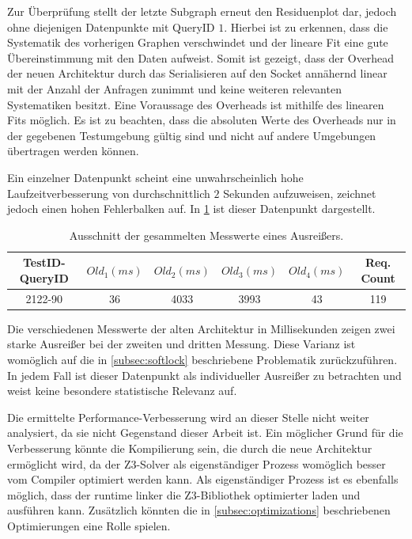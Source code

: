 Zur Überprüfung stellt der letzte Subgraph erneut den Residuenplot dar, jedoch ohne diejenigen Datenpunkte mit QueryID $1$.
Hierbei ist zu erkennen, dass die Systematik des vorherigen Graphen verschwindet und der lineare Fit eine gute Übereinstimmung mit den Daten aufweist.
Somit ist gezeigt, dass der Overhead der neuen Architektur durch das Serialisieren auf den Socket annähernd linear mit der Anzahl der Anfragen zunimmt
und keine weiteren relevanten Systematiken besitzt. Eine Voraussage des Overheads ist mithilfe des linearen Fits möglich.
Es ist zu beachten, dass die absoluten Werte des Overheads nur in der gegebenen Testumgebung gültig sind und nicht auf andere Umgebungen übertragen werden können.

Ein einzelner Datenpunkt scheint eine unwahrscheinlich hohe Laufzeitverbesserung von durchschnittlich $2$ Sekunden aufzuweisen, zeichnet jedoch einen hohen Fehlerbalken auf.
In \cref{tab:broken-datapoint} ist dieser Datenpunkt dargestellt.

\begin{table}[!htp]
    \centering
    \caption{Ausschnitt der gesammelten Messwerte eines Ausreißers.}
    \label{tab:broken-datapoint}
    \begin{tabular}{ cccccc }
        \toprule
        \textbf{TestID-QueryID} & \textbf{$Old_1(ms)$} & \textbf{$Old_2(ms)$} & \textbf{$Old_3(ms)$} & \textbf{$Old_4(ms)$} & \textbf{Req. Count} \\
        \midrule
        2122-90                 & 36                   & 4033                 & 3993                 & 43                   & 119                 \\
        \bottomrule
    \end{tabular}
\end{table}

Die verschiedenen Messwerte der alten Architektur in Millisekunden zeigen zwei starke Ausreißer bei der zweiten und dritten Messung.
Diese Varianz ist womöglich auf die in \cref{subsec:softlock} beschriebene Problematik zurückzuführen.
In jedem Fall ist dieser Datenpunkt als individueller Ausreißer zu betrachten und weist keine besondere statistische Relevanz auf.

Die ermittelte Performance-Verbesserung wird an dieser Stelle nicht weiter analysiert, da sie nicht Gegenstand dieser Arbeit ist.
Ein möglicher Grund für die Verbesserung könnte die Kompilierung sein, die durch die neue Architektur ermöglicht wird,
da der Z3-Solver als eigenständiger Prozess womöglich besser vom Compiler optimiert werden kann.
Als eigenständiger Prozess ist es ebenfalls möglich, dass der runtime linker die Z3-Bibliothek optimierter laden und ausführen kann.
Zusätzlich könnten die in \cref{subsec:optimizations} beschriebenen Optimierungen eine Rolle spielen.
